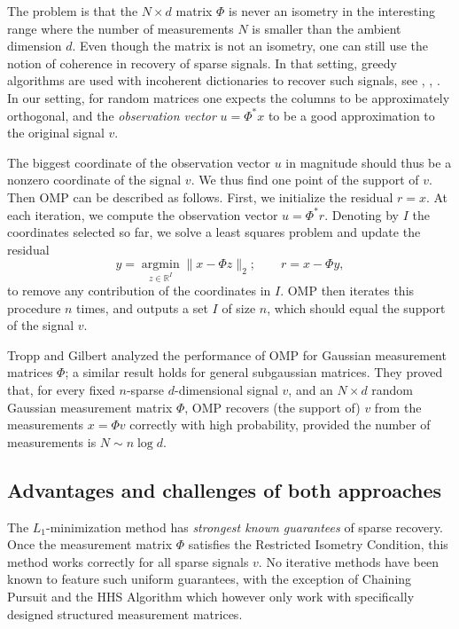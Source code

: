 \documentclass[12pt]{amsart}
\theoremstyle{plain}
\theoremstyle{definition}
\theoremstyle{remark}
\numberwithin{equation}{section}
\begin{document}
The problem is that the $N \times d$ matrix $\Phi$ 
is never an isometry in the interesting range where the number of measurements 
$N$ is smaller than the ambient dimension $d$. Even though the matrix is not an isometry, one can still
use the notion of coherence in recovery of sparse signals. In that setting, 
greedy algorithms are used with incoherent dictionaries to recover such signals, see
\cite{DET1}, \cite{DET2}, \cite{GMS}. In our setting, for random matrices
one expects the columns to be approximately orthogonal, 
and the {\em observation vector} 
$u = \Phi^* x$ to be a good approximation to the original signal $v$. 

The biggest coordinate of the observation vector $u$ in magnitude should thus 
be a nonzero coordinate of the signal $v$. We thus find one point of the support of $v$. 
Then OMP can be described as follows. First, we initialize the residual $r = x$.
At each iteration, we compute the observation vector $u = \Phi^* r$. 
Denoting by $I$ the coordinates selected so far, we solve
a least squares problem and update the residual
$$
y = \operatorname*{arg min}_{z \in {\mathbb{R}}^I} \|x - \Phi z\|_2; \qquad r = x - \Phi y,
$$
to remove any contribution of the coordinates in $I$.
OMP then iterates this procedure $n$ times, and outputs a set $I$
of size $n$, which should equal the support of the signal $v$. 

Tropp and Gilbert \cite{TG} analyzed the performance of OMP for Gaussian 
measurement matrices $\Phi$; a similar result holds for general subgaussian matrices.
They proved that, for every fixed $n$-sparse $d$-dimensional signal $v$, and 
an $N \times d$ random Gaussian measurement matrix $\Phi$, OMP recovers 
(the support of) $v$ from the measurements $x = \Phi v$ correctly with high 
probability, provided the number of measurements is $N \sim n \log d$. 

\subsection{Advantages and challenges of both approaches}

The $L_1$-mini\-mization method has {\em strongest known guarantees} of sparse recovery. 
Once the measurement matrix $\Phi$ satisfies the Restricted Isometry Condition, 
this method works correctly for all sparse signals $v$. 
No iterative methods have been known to feature 
such uniform guarantees, with the exception of Chaining Pursuit \cite{GSTV} 
and the HHS Algorithm \cite{HHS}
which however only work with specifically designed structured
measurement matrices. 
\end{document}
